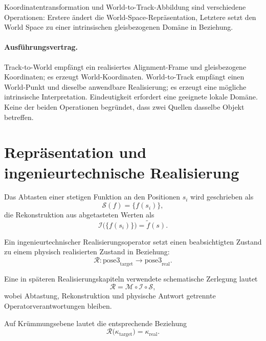 Koordinatentransformation und World-to-Track-Abbildung sind verschiedene
Operationen: Erstere ändert die World-Space-Repräsentation, Letztere setzt den
World Space zu einer intrinsischen gleisbezogenen Domäne in Beziehung.

\paragraph{Ausführungsvertrag.}
Track-to-World empfängt ein realisiertes Alignment-Frame und gleisbezogene
Koordinaten; es erzeugt World-Koordinaten. World-to-Track empfängt einen
World-Punkt und dieselbe anwendbare Realisierung; es erzeugt eine mögliche
intrinsische Interpretation. Eindeutigkeit erfordert eine geeignete lokale
Domäne. Keine der beiden Operationen begründet, dass zwei Quellen dasselbe
Objekt betreffen.

\section{Repräsentation und ingenieurtechnische Realisierung}

Das Abtasten einer stetigen Funktion an den Positionen \(s_i\) wird
geschrieben als
\begin{equation}
\mathcal S(f)=\{f(s_i)\},
\label{eq:sampling}
\end{equation}
die Rekonstruktion aus abgetasteten Werten als
\begin{equation}
\mathcal I\bigl(\{f(s_i)\}\bigr)=\widetilde f(s).
\label{eq:interpolation}
\end{equation}

Ein ingenieurtechnischer Realisierungsoperator setzt einen beabsichtigten
Zustand zu einem physisch realisierten Zustand in Beziehung:
\begin{equation}
\mathcal R:
\mathrm{pose3}_{\mathrm{target}}
\longrightarrow
\mathrm{pose3}_{\mathrm{real}}.
\label{eq:realization-operator}
\end{equation}

Eine in späteren Realisierungskapiteln verwendete schematische Zerlegung lautet
\begin{equation}
\mathcal R
=
\mathcal M\circ\mathcal I\circ\mathcal S,
\label{eq:core-realization-decomposition}
\end{equation}
wobei Abtastung, Rekonstruktion und physische Antwort getrennte
Operatorverantwortungen bleiben.

Auf Krümmungsebene lautet die entsprechende Beziehung
\begin{equation}
\mathcal R\bigl(\kappa_{\mathrm{target}}\bigr)
=
\kappa_{\mathrm{real}}.
\label{eq:curvature-realization}
\end{equation}

